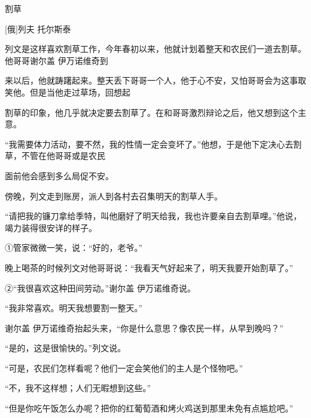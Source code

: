 \documentclass[UTF8,a4paper,fontset=fandol]{ctexart}
\begin{document}
\vspace{0.35em}\par
\hspace*{1.8em}割草\par
\hspace*{1.8em}[俄]列夫   托尔斯泰\par
\hspace*{1.8em}列文是这样喜欢割草工作，今年春初以来，他就计划着整天和农民们一道去割草。他哥哥谢尔盖   伊万诺维奇到\par
来以后，他就踌躇起来。整天丢下哥哥一个人，他于心不安，又怕哥哥会为这事取笑他。但是当他走过草场，回想起\par
割草的印象，他几乎就决定要去割草了。在和哥哥激烈辩论之后，他又想到这个主意。\par
\hspace*{1.8em}“我需要体力活动，要不然，我的性情一定会变坏了。”他想，于是他下定决心去割草，不管在他哥哥或是农民\par
面前他会感到多么局促不安。\par
\hspace*{1.8em}傍晚，列文走到账房，派人到各村去召集明天的割草人手。\par
\hspace*{1.8em}“请把我的镰刀拿给季特，叫他磨好了明天给我，我也许要亲自去割草哩。”他说，竭力装得很安详的样子。\par
\hspace*{1.8em}①管家微微一笑，说：“好的，老爷。”\par
\hspace*{1.8em}晚上喝茶的时候列文对他哥哥说：“我看天气好起来了，明天我要开始割草了。”\par
\hspace*{1.8em}②“我很喜欢这种田间劳动。”谢尔盖   伊万诺维奇说。\par
\hspace*{1.8em}“我非常喜欢。明天我想要割一整天。”\par
\hspace*{1.8em}谢尔盖 伊万诺维奇抬起头来，“你是什么意思？像农民一样，从早到晚吗？”\par
\hspace*{1.8em}“是的，这是很愉快的。”列文说。\par
\hspace*{1.8em}“可是，农民们怎样看呢？他们一定会笑他们的主人是个怪物吧。”\par
\hspace*{1.8em}“不，我不这样想；人们无暇想到这些。”\par
\hspace*{1.8em}“但是你吃午饭怎么办呢？把你的红葡萄酒和烤火鸡送到那里未免有点尴尬吧。”\par
\end{document}
